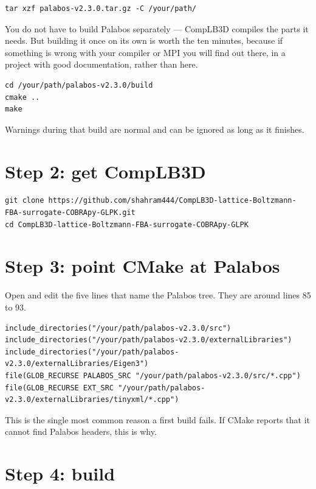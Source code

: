 \begin{lstlisting}[style=sh]
tar xzf palabos-v2.3.0.tar.gz -C /your/path/
\end{lstlisting}

You do not have to build Palabos separately --- CompLB3D compiles the parts it
needs. But building it once on its own is worth the ten minutes, because if
something is wrong with your compiler or MPI you will find out there, in a
project with good documentation, rather than here.

\begin{lstlisting}[style=sh]
cd /your/path/palabos-v2.3.0/build
cmake ..
make
\end{lstlisting}

Warnings during that build are normal and can be ignored as long as it finishes.

\section{Step 2: get CompLB3D}

\begin{lstlisting}[style=sh]
git clone https://github.com/shahram444/CompLB3D-lattice-Boltzmann-FBA-surrogate-COBRApy-GLPK.git
cd CompLB3D-lattice-Boltzmann-FBA-surrogate-COBRApy-GLPK
\end{lstlisting}

\section{Step 3: point CMake at Palabos}

Open  and edit the five lines that name the Palabos tree.
They are around lines 85 to 93.

\begin{lstlisting}[style=sh]
include_directories("/your/path/palabos-v2.3.0/src")
include_directories("/your/path/palabos-v2.3.0/externalLibraries")
include_directories("/your/path/palabos-v2.3.0/externalLibraries/Eigen3")
file(GLOB_RECURSE PALABOS_SRC "/your/path/palabos-v2.3.0/src/*.cpp")
file(GLOB_RECURSE EXT_SRC "/your/path/palabos-v2.3.0/externalLibraries/tinyxml/*.cpp")
\end{lstlisting}

This is the single most common reason a first build fails. If CMake reports
that it cannot find Palabos headers, this is why.

\section{Step 4: build}

